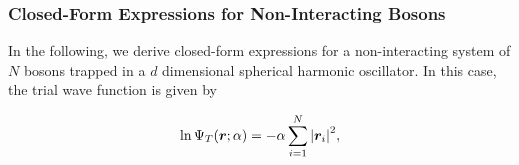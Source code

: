 









\subsubsection{Closed-Form Expressions for Non-Interacting Bosons}

In the following, we derive closed-form expressions for a non-interacting system of $N$ bosons trapped in a $d$ dimensional spherical harmonic oscillator. In this case, the trial wave function is given by 

\begin{equation*}
    \ln \Psi_T \qty(\bm{r}; \alpha) =  -\alpha \sum_{i=1}^N \abs{\bm{r}_i}^2, 
\end{equation*}

